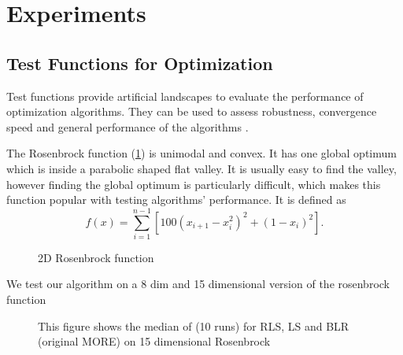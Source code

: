 \section{Experiments}
\subsection{Test Functions for Optimization}
\label{sec:test_func}
Test functions provide artificial landscapes to evaluate the
performance of optimization algorithms. They can be used to
assess robustness, convergence speed and general performance of the
algorithms \citep{molga2005test}.

The Rosenbrock function (\cref{fig:rosenbrock}) is unimodal and convex.
It has one global optimum which is inside a parabolic shaped flat valley.
It is usually easy to find the valley,
however finding the global optimum is particularly difficult,
which makes this function popular with testing algorithms’ performance.
It is defined as 
\begin{equation*}
 f(x) = \sum^{n-1}_{i=1} [100(x_{i+1} - x_i^2)^2 + (1-x_i)^2].
\end{equation*}

\begin{figure}[ht!]
    \centering
    
    \caption{2D Rosenbrock function}
    \label{fig:rosenbrock}
\end{figure}

We test our algorithm on a 8 dim and 15 dimensional version of the
rosenbrock function

\begin{figure}[ht!]
     \centering
     
     \hspace{1cm}                       
     \caption{This figure shows the median of (10 runs) for RLS, LS and BLR (original MORE) on 15 dimensional Rosenbrock}
     \label{fig:15dim}  
\end{figure}


